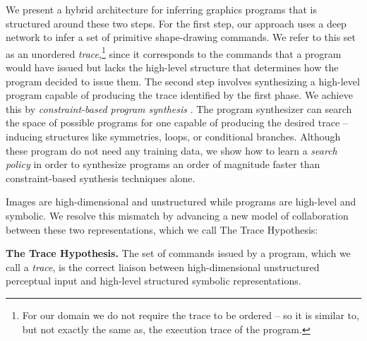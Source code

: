 \documentclass{article}
\begin{document}
We present a hybrid architecture for inferring graphics programs that is structured around these two steps. For the first step, our approach uses a deep network to infer a set of primitive shape-drawing commands. We refer to this set as an unordered \emph{trace},\footnote{For our domain we do not require the trace to be ordered -- so it is similar to, but not exactly the same as, the execution trace of the program.} since it corresponds to the commands that a program would have issued but lacks the high-level structure that determines how the program decided to issue them.
The second step involves synthesizing a high-level program capable of producing the trace identified by the first phase.
We achieve this by \emph{constraint-based program synthesis} \cite{solar2008program}. The program synthesizer can search the space of possible programs for one capable of producing the desired trace -- inducing structures like
symmetries, loops, or conditional branches.
Although these program do not need any training data,
we show how to learn a \emph{search policy} 
in order to synthesize programs an order of magnitude faster than constraint-based synthesis techniques alone.

Images are high-dimensional and unstructured while programs are high-level
and symbolic. We resolve this mismatch by advancing a new model of
collaboration between these two representations, which we call The Trace Hypothesis:

\noindent \textbf{The Trace Hypothesis.} The set of commands issued by a program,
which we call a \emph{trace},
is the correct liaison between high-dimensional unstructured perceptual input and high-level structured symbolic representations.
\end{document}
